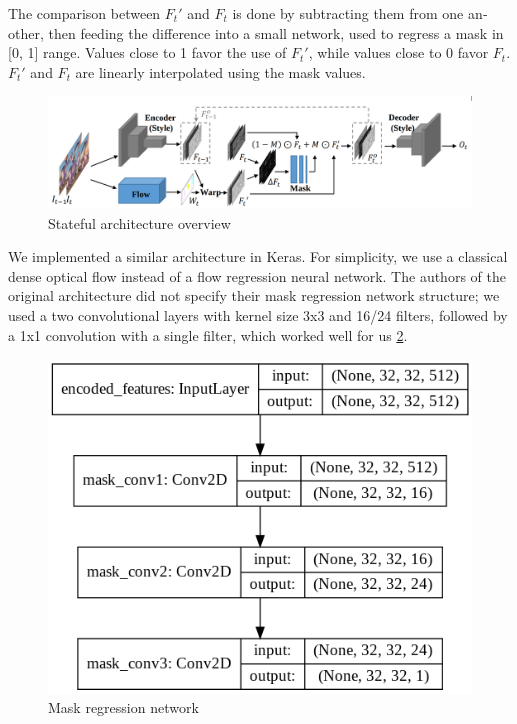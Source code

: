 \documentclass[12pt,openright,oneside,a4paper,english]{abntex2}
\begin{document}
\begin{otherlanguage}{english}
The comparison between $F_t'$ and $F_t$ is done by subtracting them from one another, then feeding the difference into a small network, used to regress a mask in [0, 1] range. Values close to 1 favor the use of $F_t'$, while values close to 0 favor $F_t$. $F_t'$ and $F_t$ are linearly interpolated using the mask values.

\begin{figure}[!htb]
\centering
\includegraphics[width=\textwidth]{optical_flow_arch}
\caption{Stateful architecture overview}  %
\label{optical_flow_arch}
\end{figure}

We implemented a similar architecture in Keras. For simplicity, we use a classical dense optical flow instead of a flow regression neural network. The authors of the original architecture did not specify their mask regression network structure; we used a two convolutional layers with kernel size 3x3 and 16/24 filters, followed by a 1x1 convolution with a single filter, which worked well for us \ref{mask_net}.

\begin{figure}[!htb]
\centering
\includegraphics[width=\textwidth/2]{mask_network}
\caption{Mask regression network}
\label{mask_net}
\end{figure}


\end{otherlanguage}
\end{document}
